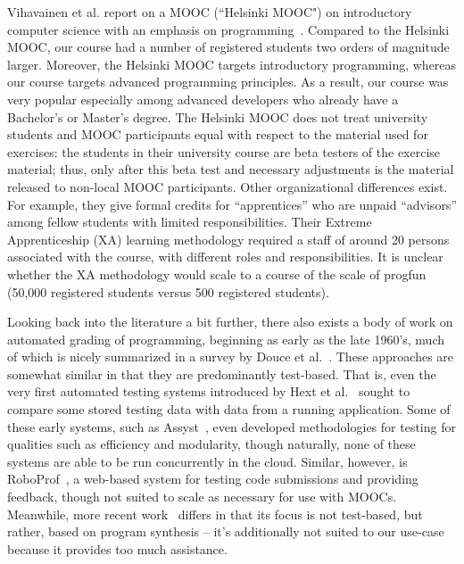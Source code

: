 \documentclass{sig-alternate}
\begin{document}
Vihavainen et al. report on a MOOC (``Helsinki MOOC") on introductory computer
science with an emphasis on programming~\cite{VihavainenLK12}. Compared to the
Helsinki MOOC, our course had a number of registered students two orders of
magnitude larger. Moreover, the Helsinki MOOC targets introductory
programming, whereas our course targets advanced programming principles. As a
result, our course was very popular especially among advanced developers who
already have a Bachelor's or Master's degree. The Helsinki MOOC does not treat
university students and MOOC participants equal with respect to the material
used for exercises: the students in their university course are beta testers
of the exercise material; thus, only after this beta test and necessary
adjustments is the material released to non-local MOOC participants. Other
organizational differences exist. For example, they give formal credits for
``apprentices'' who are unpaid ``advisors'' among fellow students with limited
responsibilities. Their Extreme Apprenticeship (XA) learning methodology
required a staff of around 20 persons associated with the course, with
different roles and responsibilities. It is unclear whether the XA methodology
would scale to a course of the scale of progfun (50,000 registered students
versus 500 registered students).

Looking back into the literature a bit further, there also exists a body of
work on automated grading of programming, beginning as early as the late 1960's,
much of which is nicely summarized in a survey by Douce et al.~\cite{Douce}. These approaches
are somewhat similar in that they are predominantly test-based. That is, even the very
first automated testing systems introduced by Hext et al.~\cite{Hext69} sought to compare
some stored testing data with data from a running application. Some of these early systems,
such as Assyst~\cite{Assyst}, even developed methodologies for testing for qualities such as
efficiency and modularity, though naturally, none of these systems are able to be run
concurrently in the cloud. Similar, however, is RoboProf~\cite{RoboProf}, a web-based system for
testing code submissions and providing feedback, though not suited to scale as necessary for use with MOOCs.
Meanwhile, more recent work~\cite{PLDI13} differs in that its focus is not test-based, but
rather, based on program synthesis – it's additionally not suited to our use-case because it
provides too much assistance.
\end{document}

